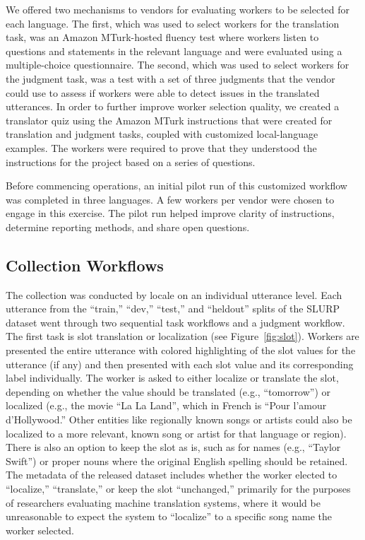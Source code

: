 \documentclass[11pt]{article}
\begin{document}
We offered two mechanisms to vendors for evaluating workers to be selected for each language.
The first, which was used to select workers for the translation task, was an Amazon  MTurk-hosted fluency test where workers listen to questions and statements in the relevant language and were evaluated using a multiple-choice questionnaire.
The second, which was used to select workers for the judgment task, was a test with a set of three judgments that the vendor could use to assess if workers were able to detect issues in the translated utterances.
In order to further improve worker selection quality, we created a translator quiz using the Amazon MTurk instructions that were created for translation and judgment tasks, coupled with customized local-language examples.
The workers were required to prove that they understood the instructions for the project based on a series of questions. 
 
Before commencing operations, an initial pilot run of this customized workflow was completed in three languages.
A few workers per vendor were chosen to engage in this exercise.
The pilot run helped improve clarity of instructions, determine reporting methods, and share open questions.

\subsection{Collection Workflows} \label{sect:localization-workflow}

The collection was conducted by locale on an individual utterance level.
Each utterance from the ``train,'' ``dev,'' ``test,'' and ``heldout'' splits of the SLURP dataset went through two sequential task workflows and a judgment workflow.
The first task is slot translation or localization (see Figure~\ref{fig:slot}).
Workers are presented the entire utterance with colored highlighting of the slot values for the utterance (if any) and then presented with each slot value and its corresponding label individually.
The worker is asked to either localize or translate the slot, depending on whether the value should be translated (e.g., ``tomorrow'') or localized (e.g., the movie ``La La Land'', which in French is ``Pour l'amour d'Hollywood.'' Other entities like regionally known songs or artists could also be localized to a more relevant, known song or artist for that language or region).
There is also an option to keep the slot as is, such as for names (e.g., ``Taylor Swift'') or proper nouns where the original English spelling should be retained.
The metadata of the released dataset includes whether the worker elected to ``localize,'' ``translate,'' or keep the slot ``unchanged,'' primarily for the purposes of researchers evaluating machine translation systems, where it would be unreasonable to expect the system to ``localize'' to a specific song name the worker selected.
\end{document}
